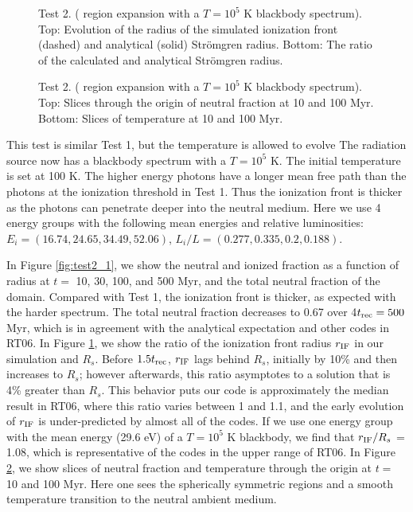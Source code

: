 \documentclass[apj,onecolumn]{emulateapj}
\begin{document}
\begin{figure}[t]
  \caption{\label{fig:test2_2} Test 2. ( region expansion
    with a $T=10^5$ K blackbody spectrum).  Top: Evolution of the
    radius of the simulated ionization front (dashed) and analytical
    (solid) Str\"{o}mgren radius.  Bottom: The ratio of the calculated
    and analytical Str\"{o}mgren radius.}
\end{figure}

\begin{figure}[]
  \caption{\label{fig:test2_3} Test 2. ( region expansion
    with a $T=10^5$ K blackbody spectrum).  Top: Slices through the
    origin of neutral fraction at 10 and 100 Myr.  Bottom: Slices of
    temperature at 10 and 100 Myr.}
\end{figure}

This test is similar Test 1, but the temperature is allowed to evolve
The radiation source now has a blackbody spectrum with a $T = 10^5$ K.
The initial temperature is set at 100 K.  The higher energy photons
have a longer mean free path than the photons at the ionization
threshold in Test 1.  Thus the ionization front is thicker as the
photons can penetrate deeper into the neutral medium.  Here we use 4
energy groups with the following mean energies and relative
luminosities: $E_i = (16.74, 24.65, 34.49, 52.06)$, $L_i/L = (0.277,
0.335, 0.2, 0.188)$.

In Figure \ref{fig:test2_1}, we show the neutral and ionized fraction
as a function of radius at $t = $ 10, 30, 100, and 500 Myr, and the
total neutral fraction of the domain.  Compared with Test 1, the
ionization front is thicker, as expected with the harder spectrum.
The total neutral fraction decreases to 0.67 over 4$t_{\rm rec} = 500$
Myr, which is in agreement with the analytical expectation and other
codes in RT06.  In Figure \ref{fig:test2_2}, we show the ratio of the
ionization front radius $r_{\rm IF}$ in our simulation and $R_s$.
Before $1.5t_{\rm rec}$, $r_{\rm IF}$ lags behind $R_s$, initially by
10\% and then increases to $R_s$; however afterwards, this ratio
asymptotes to a solution that is 4\% greater than $R_s$.  This
behavior puts our code is approximately the median result in RT06,
where this ratio varies between 1 and 1.1, and the early evolution of
$r_{\rm IF}$ is under-predicted by almost all of the codes.  If we use
one energy group with the mean energy (29.6 eV) of a $T=10^5$ K
blackbody, we find that $r_{\rm IF}/R_s$ = 1.08, which is
representative of the codes in the upper range of RT06.  In Figure
\ref{fig:test2_3}, we show slices of neutral fraction and temperature
through the origin at $t = $ 10 and 100 Myr.  Here one sees the
spherically symmetric  regions and a smooth temperature
transition to the neutral ambient medium.
\end{document}

